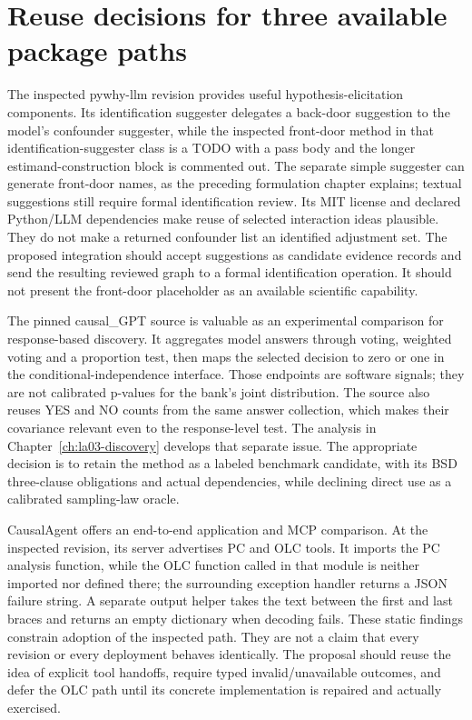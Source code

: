 \hypertarget{reuse-decisions-for-three-available-package-paths}{%
\section{Reuse decisions for three available package
paths}\label{reuse-decisions-for-three-available-package-paths}}

The inspected pywhy-llm revision provides useful hypothesis-elicitation
components. Its identification suggester delegates a back-door
suggestion to the model's confounder suggester, while the inspected
front-door method in that identification-suggester class is a TODO with a
pass body and the longer estimand-construction block is commented out. The
separate simple suggester can generate front-door names, as the preceding
formulation chapter explains; textual suggestions still require formal
identification review. Its MIT license and
declared Python/LLM dependencies make reuse of selected interaction
ideas plausible. They do not make a returned confounder list an
identified adjustment set. The proposed integration should accept
suggestions as candidate evidence records and send the resulting
reviewed graph to a formal identification operation. It should not
present the front-door placeholder as an available scientific
capability. \citep{v12_la_package_pywhy_llm}

The pinned causal\_GPT source is valuable as an experimental comparison
for response-based discovery. It aggregates model answers through
voting, weighted voting and a proportion test, then maps the selected
decision to zero or one in the conditional-independence interface. Those
endpoints are software signals; they are not calibrated p-values for the
bank's joint distribution. The source also reuses YES and NO counts from
the same answer collection, which makes their covariance relevant even
to the response-level test. The analysis in
Chapter~\ref{ch:la03-discovery} develops that separate
issue. The appropriate decision is to retain the method as a labeled
benchmark candidate, with its BSD three-clause obligations and actual
dependencies, while declining direct use as a calibrated sampling-law
oracle. \citep{v12_la_package_causal_gpt}

CausalAgent offers an end-to-end application and MCP comparison. At the
inspected revision, its server advertises PC and OLC tools. It imports
the PC analysis function, while the OLC function called in that module
is neither imported nor defined there; the surrounding exception handler
returns a JSON failure string. A separate output helper takes the text
between the first and last braces and returns an empty dictionary when
decoding fails. These static findings constrain adoption of the
inspected path. They are not a claim that every revision or every
deployment behaves identically. The proposal should reuse the idea of
explicit tool handoffs, require typed invalid/unavailable outcomes, and
defer the OLC path until its concrete implementation is repaired and
actually exercised. \citep{v12_la_package_causalagent}


